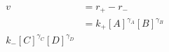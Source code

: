 \begin{eqnarray}\label{eqn:flux-def}
v & =r_+-r_- \\
&=  k_+[A]^{\gamma_A}[B]^{\gamma_B} \\  k_-[C]^{\gamma_C}[D]^{\gamma_D} \\
\end{eqnarray}